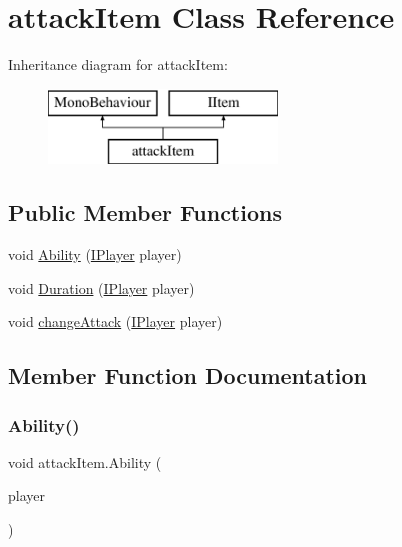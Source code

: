\hypertarget{classattack_item}{}\section{attack\+Item Class Reference}
\label{classattack_item}
Inheritance diagram for attack\+Item\+:\begin{figure}[H]
\begin{center}
\leavevmode
\includegraphics[height=2.000000cm]{classattack_item}
\end{center}
\end{figure}
\subsection*{Public Member Functions}
\begin{DoxyCompactItemize}
\item 
void \mbox{\hyperlink{classattack_item_ab5739e198a4a255f81d371df77bb770b}{Ability}} (\mbox{\hyperlink{class_i_player}{I\+Player}} player)
\item 
void \mbox{\hyperlink{classattack_item_a5cf5ac415471d294a3244988466d54ac}{Duration}} (\mbox{\hyperlink{class_i_player}{I\+Player}} player)
\item 
void \mbox{\hyperlink{classattack_item_ac4ed86e9328a04f08568bd9374685a15}{change\+Attack}} (\mbox{\hyperlink{class_i_player}{I\+Player}} player)
\end{DoxyCompactItemize}


\subsection{Member Function Documentation}
\mbox{\label{classattack_item_ab5739e198a4a255f81d371df77bb770b}} 
\subsubsection{\texorpdfstring{Ability()}{Ability()}}
{\footnotesize\ttfamily void attack\+Item.\+Ability (\begin{DoxyParamCaption}\item[{\mbox{\hyperlink{class_i_player}{I\+Player}}}]{player }\end{DoxyParamCaption})\hspace{0.3cm}{\ttfamily [inline]}}



